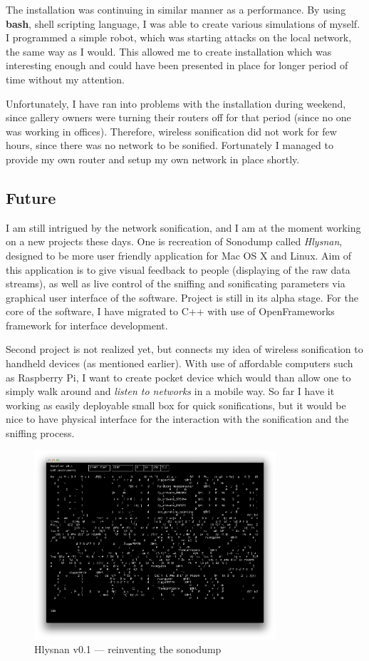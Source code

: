 \documentclass[12pt,a4paper,oneside]{report}
\begin{document}
The installation was continuing in similar manner as a performance. By using \textbf{bash}, shell scripting language, I was able to create various simulations of myself. I programmed a simple robot, which was starting attacks on the local network, the same way as I would. This allowed me to create installation which was interesting enough and could have been presented in place for longer period of time without my attention.

Unfortunately, I have ran into problems with the installation during weekend, since gallery owners were turning their routers off for that period (since no one was working in offices). Therefore, wireless sonification did not work for few hours, since there was no network to be sonified. Fortunately I managed to provide my own router and setup my own network in place shortly.

\subsection{Future}
I am still intrigued by the network sonification, and I am at the moment working on a new projects these days. One is recreation of Sonodump called \textit{Hlysnan}, designed to be more user friendly application for Mac OS X and Linux. Aim of this application is to give visual feedback to people (displaying of the raw data streams), as well as live control of the sniffing and sonificating parameters via graphical user interface of the software. Project is still in its alpha stage. For the core of the software, I have migrated to C++ with use of OpenFrameworks framework for interface development.

Second project is not realized yet, but connects my idea of wireless sonification to handheld devices (as mentioned earlier). With use of affordable computers such as Raspberry Pi, I want to create pocket device which would than allow one to simply walk around and \emph{listen to networks} in a mobile way. So far I have it working as easily deployable small box for quick sonifications, but it would be nice to have physical interface for the interaction with the sonification and the sniffing process.

\begin{figure}  
  \centering
    \includegraphics[width=0.8\textwidth]{img/hlysnan}%
	\caption{Hlysnan v0.1 --- reinventing the sonodump}
	\label{fig:hlysnan}
\end{figure}
\end{document}
